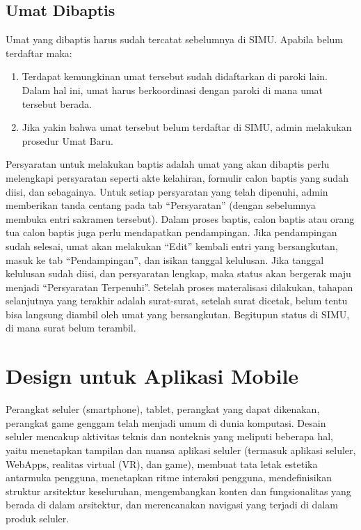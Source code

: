 \subsection{Umat Dibaptis}
\label{sec:umatDibaptis}
Umat yang dibaptis harus sudah tercatat sebelumnya di SIMU. Apabila belum terdaftar maka:

\begin{enumerate}
	\item Terdapat kemungkinan umat tersebut sudah didaftarkan di paroki lain. Dalam hal ini, umat harus berkoordinasi dengan paroki di mana umat tersebut berada.
	\item Jika yakin bahwa umat tersebut belum terdaftar di SIMU, admin melakukan prosedur Umat Baru.
\end{enumerate}

Persyaratan untuk melakukan baptis adalah umat yang akan dibaptis perlu melengkapi persyaratan seperti akte kelahiran, formulir calon baptis yang sudah diisi, dan sebagainya. Untuk setiap persyaratan yang telah dipenuhi, admin memberikan tanda centang pada tab “Persyaratan” (dengan sebelumnya membuka entri sakramen tersebut). Dalam proses baptis, calon baptis atau orang tua calon baptis juga perlu mendapatkan pendampingan. Jika pendampingan sudah selesai, umat akan melakukan “Edit” kembali entri yang bersangkutan, masuk ke tab “Pendampingan”, dan isikan tanggal kelulusan. Jika tanggal kelulusan sudah diisi, dan persyaratan lengkap, maka status akan bergerak maju menjadi “Persyaratan Terpenuhi”.
Setelah proses materalisasi dilakukan, tahapan selanjutnya yang terakhir adalah surat-surat, setelah surat dicetak, belum tentu bisa langsung diambil oleh umat yang bersangkutan. Begitupun status di SIMU, di mana surat belum terambil. 

\section{Design untuk Aplikasi Mobile}
\label{sec:designMobility}
Perangkat seluler (smartphone), tablet, perangkat yang dapat dikenakan, perangkat game genggam telah menjadi umum di dunia komputasi. Desain seluler mencakup aktivitas teknis dan nonteknis yang meliputi beberapa hal, yaitu menetapkan tampilan dan nuansa aplikasi seluler (termasuk aplikasi seluler, WebApps, realitas virtual (VR), dan game), membuat tata letak estetika antarmuka pengguna, menetapkan ritme interaksi pengguna, mendefinisikan struktur arsitektur keseluruhan, mengembangkan konten dan fungsionalitas yang berada di dalam arsitektur, dan merencanakan navigasi yang terjadi di dalam produk seluler. 

